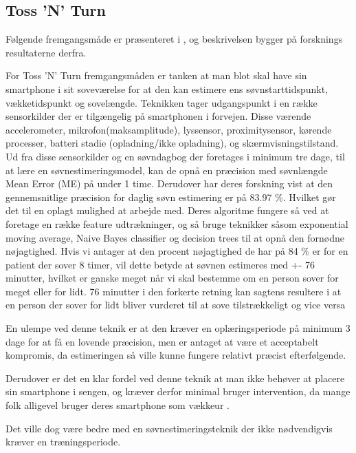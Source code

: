 \subsection{Toss 'N' Turn}\label{sec:tossNturn}
Følgende fremgangsmåde er præsenteret i \citet{Min:2014:TNT:2556288.2557220}, og beskrivelsen bygger på forsknings resultaterne derfra.

For Toss 'N' Turn fremgangsmåden er tanken at man blot skal have sin smartphone i sit soveværelse for at den kan estimere ens søvnstarttidspunkt, vækketidspunkt og sovelængde.
Teknikken tager udgangspunkt i en række sensorkilder der er tilgængelig på smartphonen i forvejen.
Disse værende accelerometer, mikrofon(maksamplitude), lyssensor, proximitysensor, kørende processer, batteri stadie (opladning/ikke opladning), og skærmvisningstilstand.
Ud fra disse sensorkilder og en søvndagbog der foretages i minimum tre dage, til at lære en søvnestimeringsmodel, kan de opnå en præcision med søvnlængde Mean Error (ME) på under 1 time.
Derudover har deres forskning vist at den gennemsnitlige præcision for daglig søvn estimering er på 83.97 \%.
Hvilket gør det til en oplagt mulighed at arbejde med.
Deres algoritme fungere så ved at foretage en række feature udtrækninger, og så bruge teknikker såsom exponential moving average, Naive Bayes classifier og decision trees til at opnå den fornødne nøjagtighed.
Hvis vi antager at den procent nøjagtighed de har på 84 \% er for en patient der sover 8 timer, vil dette betyde at søvnen estimeres med +- 76 minutter, hvilket er ganske meget når vi skal bestemme om en person sover for meget eller for lidt.
76 minutter i den forkerte retning kan sagtens resultere i at en person der sover for lidt bliver vurderet til at sove tilstrækkeligt og vice versa

En ulempe ved denne teknik er at den kræver en oplæringsperiode på minimum 3 dage for at få en lovende præcision, men er antaget at være et acceptabelt kompromis, da estimeringen så ville kunne fungere relativt præcist efterfølgende.

Derudover er det en klar fordel ved denne teknik at man ikke behøver at placere sin smartphone i sengen, og kræver derfor minimal bruger intervention, da mange folk alligevel bruger deres smartphone som vækkeur \citep{misc:phoneAlarmClock}.

Det ville dog være bedre med en søvnestimeringsteknik der ikke nødvendigvis kræver en træningsperiode.

